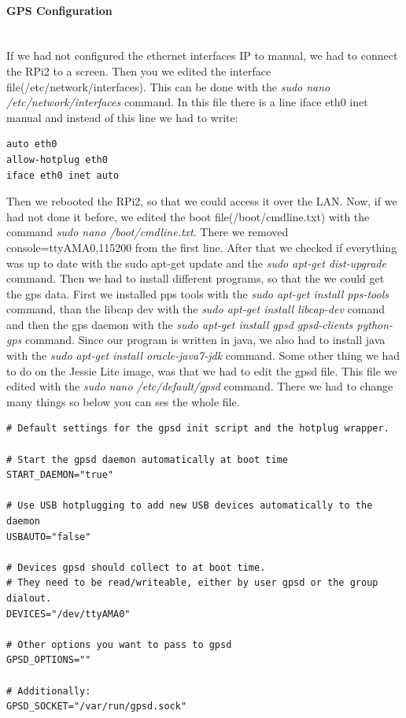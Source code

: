 \paragraph{GPS Configuration} \mbox{}\\
If we had not configured the ethernet interfaces IP to manual, we had to connect the RPi2 to a screen. Then you we edited the interface file(/etc/network/interfaces). This can be done with the \textit{sudo nano /etc/network/interfaces} command. \newline
In this file there is a line iface eth0 inet manual and instead of this line we had to write:
\begin{verbatim}
auto eth0
allow-hotplug eth0
iface eth0 inet auto
\end{verbatim}
Then we rebooted the RPi2, so that we could access it over the LAN. \newline
Now, if we had not done it before, we edited the boot file(/boot/cmdline.txt) with the command \textit{sudo nano /boot/cmdline.txt}. \newline
There we removed console=ttyAMA0,115200 from the first line.\newline
After that we checked if everything was up to date with the sudo apt-get update and the \textit{sudo apt-get dist-upgrade} command.\newline
Then we had to install different programs, so that the we could get the gps data.\newline
First we installed pps tools with the \textit{sudo apt-get install pps-tools} command, than the libcap dev with the \textit{sudo apt-get install libcap-dev} comand and then the gps daemon with the \textit{sudo apt-get install gpsd gpsd-clients python-gps} command.\newline
Since our program is written in java, we also had to install java with the \textit{sudo apt-get install oracle-java7-jdk} command.\newline
Some other thing we had to do on the Jessie Lite image, was that we had to edit the gpsd file. This file we edited with the \textit{sudo nano /etc/default/gpsd} command.\newline
There we had to change many things so below you can ses the whole file. 
\begin{verbatim}
# Default settings for the gpsd init script and the hotplug wrapper.

# Start the gpsd daemon automatically at boot time
START_DAEMON="true"

# Use USB hotplugging to add new USB devices automatically to the daemon
USBAUTO="false"

# Devices gpsd should collect to at boot time.
# They need to be read/writeable, either by user gpsd or the group dialout.
DEVICES="/dev/ttyAMA0"

# Other options you want to pass to gpsd
GPSD_OPTIONS=""

# Additionally:
GPSD_SOCKET="/var/run/gpsd.sock"
\end{verbatim}

